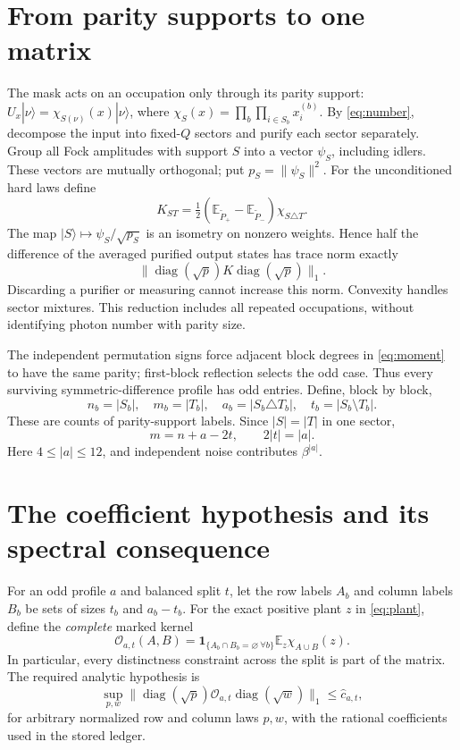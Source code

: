 \documentclass[11pt]{article}
\newcommand{\E}{\mathbb E}
\newcommand{\diag}{\operatorname{diag}}
\begin{document}
\section{From parity supports to one matrix}\label{sec:matrix}
The mask acts on an occupation only through its parity support:
$U_x|\nu\rangle=\chi_{S(\nu)}(x)|\nu\rangle$, where
$\chi_S(x)=\prod_b\prod_{i\in S_b}x_i^{(b)}$.
By \eqref{eq:number}, decompose the input into fixed-$Q$ sectors and
purify each sector separately. Group all Fock amplitudes with support
$S$ into a vector $\psi_S$, including idlers. These vectors are mutually
orthogonal; put $p_S=\|\psi_S\|^2$.
For the unconditioned hard laws define
\begin{equation}
 K_{ST}=\tfrac12(\E_{\widetilde P_+}-\E_{\widetilde P_-})
                         \chi_{S\triangle T}.
 \label{eq:moment}
\end{equation}
The map $|S\rangle\mapsto\psi_S/\sqrt{p_S}$ is an isometry on nonzero
weights. Hence half the difference of the averaged purified output
states has trace norm exactly
\begin{equation}
                  \|\diag(\sqrt p)K\diag(\sqrt p)\|_1 .
 \label{eq:trace}
\end{equation}
Discarding a purifier or measuring cannot increase this norm.
Convexity handles sector mixtures. This reduction includes all repeated
occupations, without identifying photon number with parity size.

The independent permutation signs force adjacent block degrees in
\eqref{eq:moment} to have the same parity; first-block reflection selects
the odd case. Thus every surviving symmetric-difference profile has
odd entries. Define, block by block,
\[
 n_b=|S_b|,\quad m_b=|T_b|,\quad
 a_b=|S_b\triangle T_b|,\quad t_b=|S_b\setminus T_b|.
\]
These are counts of parity-support labels. Since $|S|=|T|$ in one sector,
\begin{equation}
                 m=n+a-2t,\qquad 2|t|=|a|.
 \label{eq:compat}
\end{equation}
Here $4\le|a|\le12$, and independent noise contributes $\beta^{|a|}$.

\section{The coefficient hypothesis and its spectral consequence}\label{sec:ledger}
For an odd profile $a$ and balanced split $t$, let the row labels $A_b$
and column labels $B_b$ be sets of sizes $t_b$ and $a_b-t_b$.
For the exact positive plant $z$ in \eqref{eq:plant}, define the
\emph{complete} marked kernel
\[
 \mathcal O_{a,t}(A,B)=
 \mathbf1_{\{A_b\cap B_b=\varnothing\ \forall b\}}
               \E_z\chi_{A\cup B}(z).
\]
In particular, every distinctness constraint across the split is part
of the matrix. The required analytic hypothesis is
\begin{equation}
 \sup_{p,w}
 \|\diag(\sqrt p)\mathcal O_{a,t}\diag(\sqrt w)\|_1
       \le\widehat c_{a,t},
 \label{eq:coefficient}
\end{equation}
for arbitrary normalized row and column laws $p,w$, with the rational
coefficients used in the stored ledger.
\end{document}

